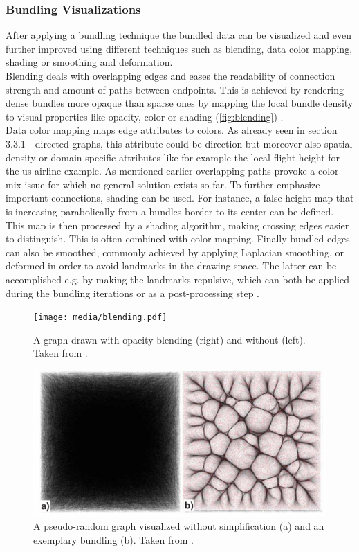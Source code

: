 \subsubsection{Bundling Visualizations}
After applying a bundling technique the bundled data can be visualized and even further improved using different techniques such as blending, data color mapping, shading or smoothing and deformation.\\
Blending deals with overlapping edges and eases the readability of connection strength and amount of paths between endpoints. This is achieved by rendering dense bundles more opaque than sparse ones by mapping the local bundle density to visual properties like opacity, color or shading (\autoref{fig:blending}) \cite{Lhuillier2017}.\\
Data color mapping maps edge attributes to colors. As already seen in section 3.3.1 - directed graphs, this attribute could be direction but moreover also spatial density or domain specific attributes like for example the local flight height for the us airline example. As mentioned earlier overlapping paths provoke a color mix issue for which no general solution exists so far.
To further emphasize important connections, shading can be used. For instance, a false height map that is increasing parabolically from a bundles border to its center can be defined. This map is then processed by a shading algorithm, making crossing edges easier to distinguish. This is often combined with color mapping.
Finally bundled edges can also be smoothed, commonly achieved by applying Laplacian smoothing, or deformed in order to avoid landmarks in the drawing space. The latter can be accomplished e.g. by making the landmarks repulsive, which can both be applied during the bundling iterations or as a post-processing step \cite{Lhuillier2017}.

\begin{figure}
    \centering
    \texttt{[image: media/blending.pdf]}
    \caption{A graph drawn with opacity blending (right) and without (left). Taken from \cite{Lhuillier2017}.}
    \label{fig:blending}
\end{figure}
\begin{figure}
    \centering
    \includegraphics[scale=0.7]{media/faithfullness_bundling.pdf}
    \caption{A pseudo-random graph visualized without simplification (a) and an exemplary bundling (b). Taken from \cite{Lhuillier2017}.}
    \label{fig:faithfulness}
\end{figure}
